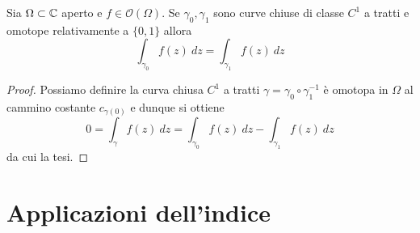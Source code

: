 \begin{corollary}
  Sia $\Omega \subset \mathbb{C}$ aperto e $f \in \mathcal{O}(\Omega)$. Se
  $\gamma_0, \gamma_1$ sono curve chiuse di classe $C^1$ a tratti e omotope
  relativamente a $\{0,1\}$ allora 
  \begin{equation*}
    \int_{\gamma_0} f(z)\ dz = \int_{\gamma_1} f(z)\ dz
  \end{equation*}
  \label{cor:omotopia-curve-aperte-implica-integrali-di-linea-uguali}
\end{corollary}
\begin{proof}
  Possiamo definire la curva chiusa $C^1$ a tratti $\gamma = \gamma_0 \circ
  \gamma^{-1}_1$ è omotopa in $\Omega$ al cammino costante
  $c_{\gamma(0)}$ e dunque si ottiene 
  \begin{equation*}
    0 = \int_\gamma f(z)\ dz = \int_{\gamma_0} f(z)\ dz - \int_{\gamma_1}
    f(z)\ dz
  \end{equation*}
  da cui la tesi.
\end{proof}

\section{Applicazioni dell'indice}


